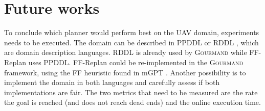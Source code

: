 \documentclass[runningheads,a4paper]{llncs}
\begin{document}

\section{Future works}

To conclude which planner would perform best on the UAV domain, experiments
needs to be executed. The domain can be described in PPDDL
\cite{younes2004ppddl1} or RDDL \cite{Sanner:RDDL}, which are domain
description languages. RDDL is already used by \textsc{Gourmand} while
FF-Replan uses PPDDL\@. FF-Replan could be re-implemented in the
\textsc{Gourmand} framework, using the FF heuristic found in mGPT
\cite{bonet2011planning}. Another possibility is to implement the domain in
both languages and carefully assess if both implementations are fair.  The two
metrics that need to be measured are the rate the goal is reached (and does not
reach dead ends) and the online execution time.



\end{document}
